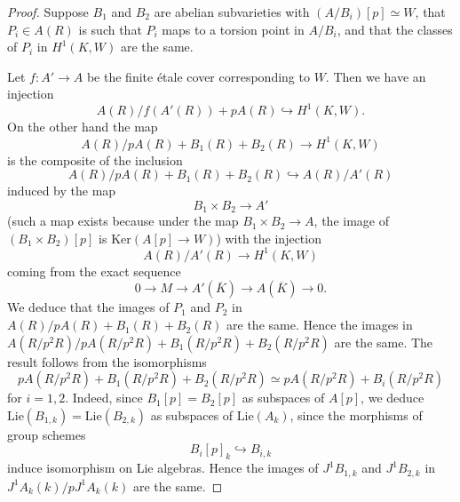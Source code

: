 \documentclass[10pt,a4paper]{amsart}
\newcommand{\Ker}{\mathrm{Ker}}
\newcommand{\Lie}{\mathrm{Lie}}
\begin{document}
\begin{proof}
Suppose $B_1 $ and $B_2 $ are abelian subvarieties with $(A/B_i )[p]\simeq W$, that $P_i \in A(R)$ is such that $P_i$ maps to a torsion point in $A/B_i$, and that the classes of $P_i$ in $H^1 (K,W)$ are the same.

Let $f:A'\to A$ be the finite \'etale cover corresponding to $W$. Then we have an injection
\[
A(R)/f(A'(R))+pA(R)\hookrightarrow H^1 (K,W).
\]
On the other hand the map
\[
A(R)/pA(R)+B_1 (R)+B_2 (R) \to H^1 (K,W)
\]
is the composite of the inclusion
\[
A(R)/pA(R)+B_1 (R)+B_2 (R) \hookrightarrow A(R)/A'(R)
\]
induced by the map
\[
B_1 \times B_2 \to A'
\]
(such a map exists because under the map $B_1 \times B_2 \to A$, the image of $(B_1 \times B_2 )[p]$ is $\Ker (A[p]\to W)$) with the injection
\[
A(R)/A'(R)\to H^1 (K,W)
\]
coming from the exact sequence
\[
0\to M\to A' (\overline{K})\to A(\overline{K})\to 0.
\]
We deduce that the images of $P_1$ and $P_2 $ in $A(R)/pA(R)+B_1 (R)+B_2 (R)$ are the same. Hence the images in $A(R/p^2 R)/pA(R/p^2 R)+B_1 (R/p^2 R)+B_2 (R/p^2 R)$ are the same. The result follows from the isomorphisms
\[
pA(R/p^2 R)+B_1 (R/p^2 R)+B_2 (R/p^2 R)\simeq pA(R/p^2 R)+B_i (R/p^2 R)
\]
for $i=1,2$. Indeed, since $B_1 [p]=B_2 [p]$ as subspaces of $A[p]$, we deduce $\Lie (B_{1,k})=\Lie (B_{2,k})$ as subspaces of $\Lie (A_k )$, since the morphisms of group schemes
\[
B_i [p]_k \hookrightarrow B_{i,k}
\]
induce isomorphism on Lie algebras. Hence the images of $J^1 B_{1,k}$ and $J^1 B_{2,k}$ in $J^1 A_k (k)/pJ^1 A_k (k)$ are the same.
\end{proof}
\end{document}

